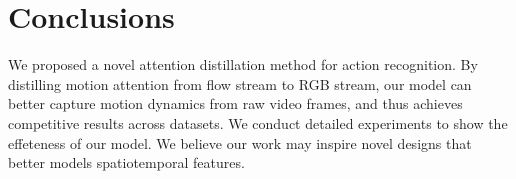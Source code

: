 \documentclass[10pt,twocolumn,letterpaper]{article}
\begin{document}
\section{Conclusions}

We proposed a novel attention distillation method for action recognition. By distilling motion attention from flow stream to RGB stream, our model can better capture motion dynamics from raw video frames, and thus achieves competitive results across datasets. We conduct detailed experiments to show the effeteness of our model. We believe our work may inspire novel designs that better models spatiotemporal features.
{\small


}
\end{document}
